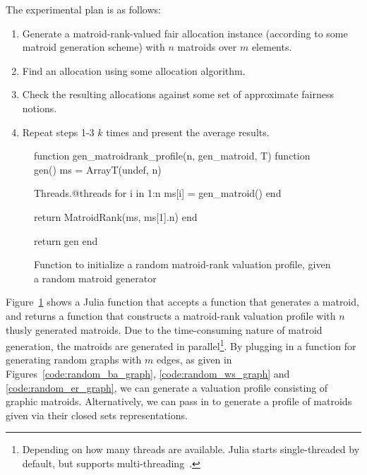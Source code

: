 The experimental plan is as follows:
\begin{enumerate}
  \item Generate a matroid-rank-valued fair allocation instance (according to some matroid generation scheme) with $n$ matroids over $m$ elements.
  \item Find an allocation using some allocation algorithm.
  \item Check the resulting allocations against some set of approximate fairness notions.
  \item Repeat steps 1-3 $k$ times and present the average results.
\end{enumerate}



\begin{figure}
  \begin{jllisting}
function gen_matroidrank_profile(n, gen_matroid, T)
  function gen()
    ms = Array{T}(undef, n)

    Threads.@threads for i in 1:n
      ms[i] = gen_matroid()
    end

    return MatroidRank(ms, ms[1].n)
  end

  return gen
end
  \end{jllisting}
  \caption{Function to initialize a random matroid-rank valuation profile, given a random matroid generator}
  \label{code:gen_matroidrank_profile}
\end{figure}

Figure~\ref{code:gen_matroidrank_profile} shows a Julia function that accepts a function that generates a matroid, and returns a function that constructs a matroid-rank valuation profile with $n$ thusly generated matroids. Due to the time-consuming nature of matroid generation, the matroids are generated in parallel\footnote{Depending on how many threads are available. Julia starts single-threaded by default, but supports multi-threading~\cite{bezanson2017julia}.}. By plugging in a function for generating random graphs with $m$ edges, as given in Figures~\ref{code:random_ba_graph}, \ref{code:random_ws_graph} and \ref{code:random_er_graph}, we can generate a valuation profile consisting of graphic matroids. Alternatively, we can pass in  to generate a profile of matroids given via their closed sets representations.

